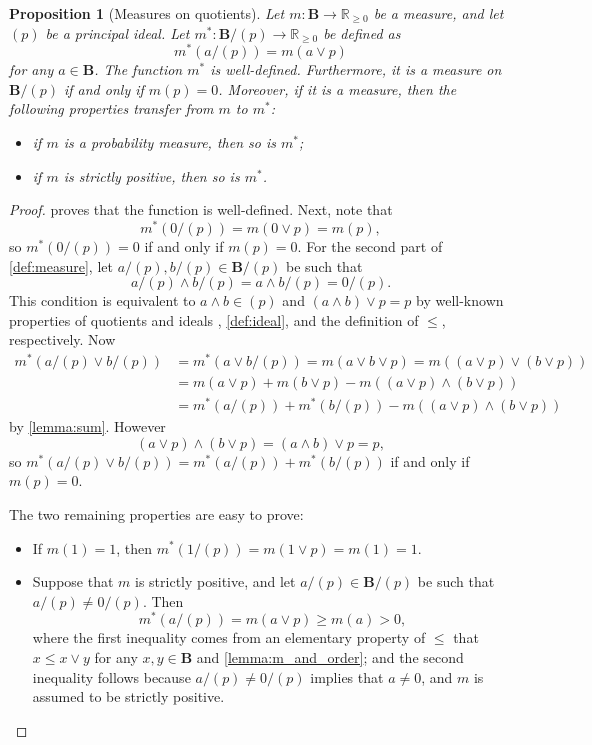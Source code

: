 \documentclass{article}
\newtheorem{proposition}{Proposition}
\theoremstyle{definition}
\theoremstyle{remark}
\begin{document}
\begin{proposition}[Measures on quotients] \label{def:measures_on_quotients}
  Let $m\colon \mathbf{B} \to \mathbb{R}_{\ge 0}$ be a measure, and let $(p)$ be
  a principal ideal. Let $m^*\colon \mathbf{B}/(p) \to \mathbb{R}_{\ge 0}$ be
  defined as
  \[
    m^*(a/(p)) = m(a \lor p)
  \]
  for any $a \in \mathbf{B}$. The function $m^*$ is well-defined. Furthermore,
  it is a measure on $\mathbf{B}/(p)$ if and only if $m(p) = 0$. Moreover, if it
  is a measure, then the following properties transfer from $m$ to $m^*$:
  \begin{itemize}
  \item if $m$ is a \emph{probability measure}, then so is $m^*$;
  \item if $m$ is \emph{strictly positive}, then so is $m^*$.
  \end{itemize}
\end{proposition}
\begin{proof}
   proves that the function is well-defined. Next,
  note that
  \[
    m^*(0/(p)) = m(0 \lor p) = m(p),
  \]
  so $m^*(0/(p)) = 0$ if and only if $m(p) = 0$. For the second part of
  \cref{def:measure}, let $a/(p), b/(p) \in \mathbf{B}/(p)$ be such that
  \[
    a/(p) \land b/(p) = a \land b / (p) = 0 / (p).
  \]
  This condition is equivalent to $a \land b \in (p)$ and $(a \land b) \lor p =
  p$ by well-known properties of quotients and ideals
  \cite{givant2008introduction}, \cref{def:ideal}, and the definition of $\le$,
  respectively. Now
  \begin{align*}
    m^*(a/(p) \lor b/(p)) &= m^*(a \lor b / (p)) = m(a \lor b \lor p) = m((a \lor p) \lor (b \lor p)) \\
                          &= m(a \lor p) + m(b \lor p) - m((a \lor p) \land (b \lor p)) \\
                          &= m^*(a/(p)) + m^*(b/(p)) - m((a \lor p) \land (b \lor p))
  \end{align*}
  by \cref{lemma:sum}. However
  \[
    (a \lor p) \land (b \lor p) = (a \land b) \lor p = p,
  \]
  so $m^*(a/(p) \lor b/(p)) = m^*(a/(p)) + m^*(b/(p))$ if and only if $m(p) = 0$.

  The two remaining properties are easy to prove:
  \begin{itemize}
  \item If $m(1) = 1$, then $m^*(1/(p)) = m(1 \lor p) = m (1) = 1$.
  \item Suppose that $m$ is strictly positive, and let $a/(p) \in
    \mathbf{B}/(p)$ be such that $a/(p) \ne 0/(p)$. Then
    \[
      m^*(a/(p)) = m(a \lor p) \ge m(a) > 0,
    \]
    where the first inequality comes from an elementary property of $\le$ that
    $x \le x \lor y$ for any $x, y \in \mathbf{B}$ \cite{sikorski1969boolean}
    and \cref{lemma:m_and_order}; and the second inequality follows because
    $a/(p) \ne 0/(p)$ implies that $a \ne 0$, and $m$ is assumed to be strictly
    positive.
  \end{itemize}
\end{proof}
\end{document}

